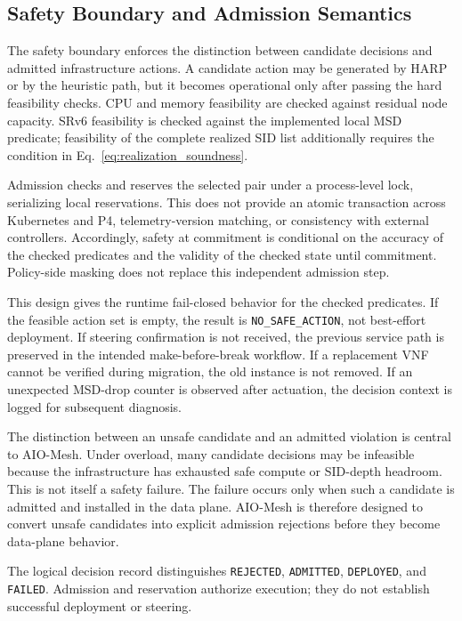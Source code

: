 \documentclass[final,5p]{elsarticle}
\newcommand{\rev}[1]{\textcolor{BrickRed}{#1}}
\begin{document}
\subsection{Safety Boundary and Admission Semantics}
\label{subsec:safety_boundary}
\label{subsec:freshness_revalidation}

The safety boundary enforces the distinction between candidate decisions and admitted infrastructure actions. A candidate action may be generated by HARP or by the heuristic path, but it becomes operational only after passing the hard feasibility checks. CPU and memory feasibility are checked against residual node capacity. SRv6 feasibility is checked \rev{against the implemented local MSD predicate; feasibility of the complete realized SID list additionally requires the condition in Eq.~\eqref{eq:realization_soundness}}.

\rev{Admission checks and reserves the selected pair under a process-level lock, serializing local reservations. This does not provide an atomic transaction across Kubernetes and P4, telemetry-version matching, or consistency with external controllers. Accordingly, safety at commitment is conditional on the accuracy of the checked predicates and the validity of the checked state until commitment. Policy-side masking does not replace this independent admission step.}

This design gives the runtime \rev{fail-closed behavior for the checked predicates}. If the feasible action set is empty, the result is \texttt{NO\_SAFE\_ACTION}, not best-effort deployment. If steering confirmation is not received, the previous service path is preserved \rev{in the intended make-before-break workflow}. If a replacement VNF cannot be verified during migration, the old instance is not removed. If an unexpected MSD-drop counter is observed after actuation, the decision context is logged \rev{for subsequent diagnosis}.

The distinction between an unsafe candidate and an admitted violation is central to AIO-Mesh. Under overload, many candidate decisions may be infeasible because the infrastructure has exhausted safe compute or SID-depth headroom. This is not itself a safety failure. The failure occurs only when such a candidate is admitted and installed in the data plane. AIO-Mesh is therefore designed to convert unsafe candidates into explicit admission rejections before they become data-plane behavior.

\sloppy
\rev{The logical decision record distinguishes \texttt{REJECTED}, \texttt{ADMITTED}, \texttt{DEPLOYED}, and \texttt{FAILED}. Admission and reservation authorize execution; they do not establish successful deployment or steering.}
\end{document}
